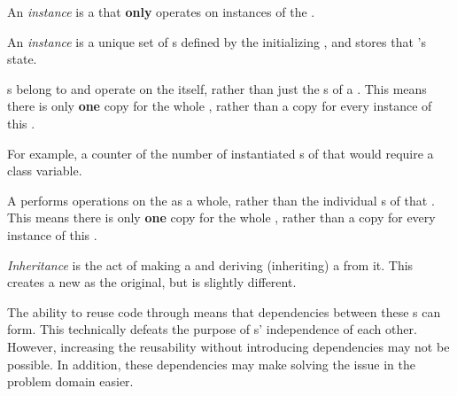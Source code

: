 \begin{definition}\label{def:OOP_Instance_Method}
  An \emph{instance } is a  that \textbf{only} operates on instances of the .
\end{definition}

\begin{definition}\label{def:OOP_Instance_Variable}
  An \emph{instance } is a unique set of s defined by the initializing , and stores that 's state.
\end{definition}

\begin{definition}\label{def:OOP_Class_Variable}
  \emph{ }s belong to and operate on the  itself, rather than just the s of a .
  This means there is only \textbf{one} copy for the whole , rather than a copy for every instance of this .

  For example, a counter of the number of instantiated s of that  would require a class variable.
\end{definition}

\begin{definition}\label{def:OOP_Class_Method}
  A \emph{ } performs operations on the  as a whole, rather than the individual s of that .
  This means there is only \textbf{one} copy for the whole , rather than a copy for every instance of this .
\end{definition}

\begin{definition}[Inheritance]\label{def:OOP_Inheritance}
  \emph{Inheritance} is the act of making a  and deriving (inheriting) a  from it.
  This creates a new  as the original, but is slightly different.

  \begin{remark}
    The ability to reuse code through  means that dependencies between these s can form.
    This technically defeats the purpose of s' independence of each other.
    However, increasing the reusability without introducing dependencies may not be possible.
    In addition, these dependencies may make solving the issue in the problem domain easier.
  \end{remark}
\end{definition}

